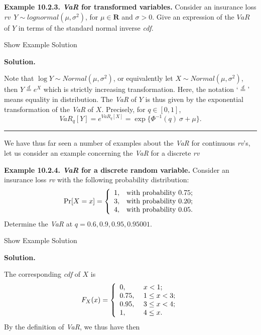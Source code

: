 \documentclass[]{book}
\theoremstyle{definition}
\theoremstyle{definition}
\theoremstyle{definition}
\theoremstyle{remark}
\begin{document}
\textbf{Example 10.2.3. \emph{VaR} for transformed variables.} Consider
an insurance loss \emph{rv}~\(Y\sim lognormal(\mu,\sigma^2)\), for
\(\mu\in \mathbf{R}\) and \(\sigma>0\). Give an expression of the
\(VaR\) of \(Y\) in terms of the standard normal inverse \emph{cdf}.

Show Example Solution

\hypertarget{toggleExamplePortMgt.2.3}{}
\textbf{Solution.}

Note that \(\log Y\sim Normal(\mu,\sigma^2)\), or equivalently let
\(X\sim Normal(\mu,\sigma^2)\), then \(Y\overset{d}{=}e^{X}\) which is
strictly increasing transformation. Here, the notation
`\(\overset{d}{=}\)' means equality in distribution. The \emph{VaR} of
\(Y\) is thus given by the exponential transformation of the \emph{VaR}
of \(X\). Precisely, for \(q\in [0,1]\), \[
VaR_{q}[Y]= e^{VaR_q[X]}=\exp\{\Phi^{-1}(q)\ \sigma+\mu\}.
\]

\begin{center}\rule{0.5\linewidth}{\linethickness}\end{center}

We have thus far seen a number of examples about the \emph{VaR} for
continuous \emph{rv}'s, let us consider an example concerning the
\emph{VaR} for a discrete \emph{rv}

\textbf{Example 10.2.4. \emph{VaR} for a discrete random variable.}
Consider an insurance loss \emph{rv} with the following probability
distribution: \[
\Pr[X=x]=\left\{
                  \begin{array}{ll}
                    1, & \hbox{with probability $0.75$;} \\
                    3, & \hbox{with probability $0.20$;} \\
                    4, & \hbox{with probability $0.05$.}
                  \end{array}
                \right.
\] Determine the \emph{VaR} at \(q = 0.6, 0.9, 0.95, 0.95001\).

Show Example Solution

\hypertarget{toggleExamplePortMgt.2.4}{}
\textbf{Solution.}

The corresponding \emph{cdf} of \(X\) is \[
F_X(x)=\left\{
         \begin{array}{ll}
           0, & \hbox{ $x<1$;} \\
           0.75, & \hbox{ $1\leq x<3$;} \\
           0.95, & \hbox{ $3\leq x<4$;} \\
           1, & \hbox{ $4\leq x$.}
         \end{array}
       \right.
\] By the definition of \emph{VaR}, we thus have then
\end{document}
